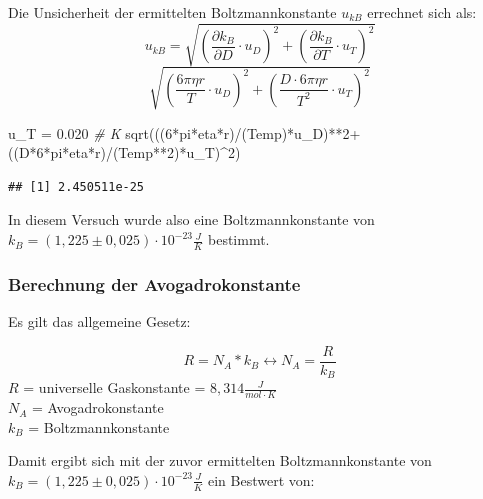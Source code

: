 \documentclass[
  9pt,
]{article}
\newenvironment{Shaded}{\begin{snugshade}}{\end{snugshade}}
\newcommand{\CommentTok}[1]{\textcolor[rgb]{0.56,0.35,0.01}{\textit{#1}}}
\newcommand{\DecValTok}[1]{\textcolor[rgb]{0.00,0.00,0.81}{#1}}
\newcommand{\FloatTok}[1]{\textcolor[rgb]{0.00,0.00,0.81}{#1}}
\newcommand{\FunctionTok}[1]{\textcolor[rgb]{0.00,0.00,0.00}{#1}}
\newcommand{\NormalTok}[1]{#1}
\newcommand{\OtherTok}[1]{\textcolor[rgb]{0.56,0.35,0.01}{#1}}
\newcommand{\SpecialCharTok}[1]{\textcolor[rgb]{0.00,0.00,0.00}{#1}}
\begin{document}
Die Unsicherheit der ermittelten Boltzmannkonstante \(u_{kB}\) errechnet
sich als:
\[u_{kB} = \sqrt{(\frac{\partial k_B}{\partial D}\cdot u_D)^2 + (\frac{\partial k_B}{\partial T}\cdot u_T)^2}\]
\[\sqrt{(\frac{6\pi \eta r}{T}\cdot u_D)^2+(\frac{D\cdot 6\pi \eta r}{T^2} \cdot u_T)^2}\]

\begin{Shaded}
\begin{Highlighting}[]
\NormalTok{u\_T }\OtherTok{=} \FloatTok{0.020} \CommentTok{\# K}
\FunctionTok{sqrt}\NormalTok{(((}\DecValTok{6}\SpecialCharTok{*}\NormalTok{pi}\SpecialCharTok{*}\NormalTok{eta}\SpecialCharTok{*}\NormalTok{r)}\SpecialCharTok{/}\NormalTok{(Temp)}\SpecialCharTok{*}\NormalTok{u\_D)}\SpecialCharTok{**}\DecValTok{2}\SpecialCharTok{+}\NormalTok{((D}\SpecialCharTok{*}\DecValTok{6}\SpecialCharTok{*}\NormalTok{pi}\SpecialCharTok{*}\NormalTok{eta}\SpecialCharTok{*}\NormalTok{r)}\SpecialCharTok{/}\NormalTok{(Temp}\SpecialCharTok{**}\DecValTok{2}\NormalTok{)}\SpecialCharTok{*}\NormalTok{u\_T)}\SpecialCharTok{\^{}}\DecValTok{2}\NormalTok{)}
\end{Highlighting}
\end{Shaded}

\begin{verbatim}
## [1] 2.450511e-25
\end{verbatim}

In diesem Versuch wurde also eine Boltzmannkonstante von
\(k_B = (1,225 \pm 0,025) \cdot 10^{-23} \frac{J}{K}\) bestimmt.

\hypertarget{berechnung-der-avogadrokonstante}{%
\subsubsection{Berechnung der
Avogadrokonstante}\label{berechnung-der-avogadrokonstante}}

Es gilt das allgemeine Gesetz:

\begin{equation*}
R=N_A*k_B \leftrightarrow N_A = \frac{R}{k_B}
\end{equation*} \noindent \(R\) = universelle Gaskonstante =
\(8,314 \frac{J}{mol\cdot K}\)\\
\noindent \(N_A\) = Avogadrokonstante\\
\noindent \(k_B\) = Boltzmannkonstante

Damit ergibt sich mit der zuvor ermittelten Boltzmannkonstante von
\(k_B = (1,225 \pm 0,025) \cdot 10^{-23} \frac{J}{K}\) ein Bestwert von:
\end{document}
